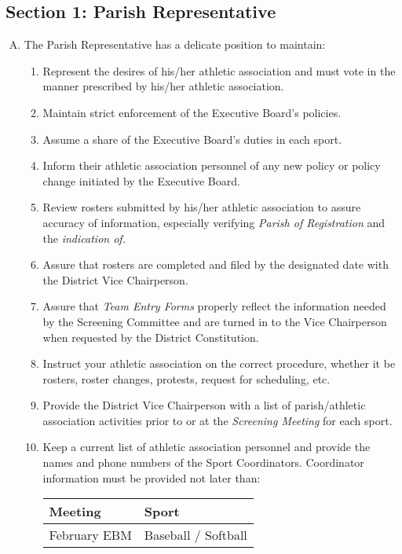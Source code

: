 \subsection{Section 1: Parish Representative}
\label{ssec:rules-g-1}
\begin{enumerate}[A.]
    \item The Parish Representative has a delicate position to maintain:
    \begin{enumerate}[1.]
        \item Represent the desires of his/her athletic association and must vote in the manner prescribed by his/her athletic association.
        \item Maintain strict enforcement of the Executive Board's policies.
        \item Assume a share of the Executive Board's duties in each sport.
        \item Inform their athletic association personnel of any new policy or policy change initiated by the Executive Board.
        \item Review rosters submitted by his/her athletic association to assure accuracy of information, especially verifying {\em Parish of Registration} and the {\em indication of.}
        \item Assure that rosters are completed and filed by the designated date with the District Vice Chairperson.
        \item Assure that {\em Team Entry Forms} properly reflect the information needed by the Screening Committee and are turned in to the Vice Chairperson when requested by the District Constitution.
        \item Instruct your athletic association on the correct procedure, whether it be rosters, roster changes, protests, request for scheduling, etc.
        \item Provide the District Vice Chairperson with a list of parish/athletic association activities prior to or at the {\em Screening Meeting} for each sport.
        \item Keep a current list of athletic association personnel and provide the names and phone numbers of the Sport Coordinators.   Coordinator information must be provided not later than:
        \begin{center}
            \begin{tabular}{l l}
                Meeting & Sport \\
                \hline
                February EBM & Baseball / Softball \\

\end{tabular}
\end{center}
\end{enumerate}
\end{enumerate}

